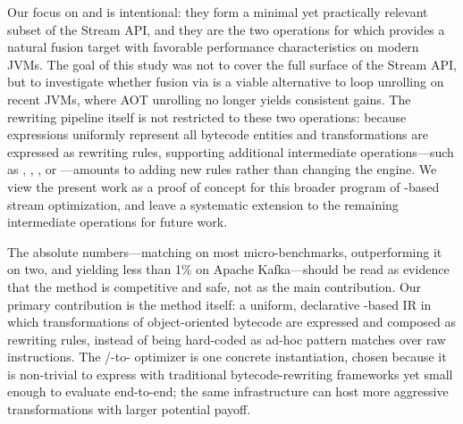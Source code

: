 Our focus on  and  is intentional: they form a minimal yet practically relevant subset of the Stream API, and they are the two operations for which  provides a natural fusion target with favorable performance characteristics on modern JVMs.
The goal of this study was not to cover the full surface of the Stream API, but to investigate whether fusion via  is a viable alternative to loop unrolling on recent JVMs, where AOT unrolling no longer yields consistent gains.
The rewriting pipeline itself is not restricted to these two operations: because \phic{} expressions uniformly represent all bytecode entities and transformations are expressed as rewriting rules, supporting additional intermediate operations---such as , , , or ---amounts to adding new rules rather than changing the engine.
We view the present work as a proof of concept for this broader program of \phic{}-based stream optimization, and leave a systematic extension to the remaining intermediate operations for future work.

The absolute numbers---matching \streamliner{} on most micro-benchmarks, outperforming it on two, and yielding less than 1\% on Apache Kafka---should be read as evidence that the method is competitive and safe, not as the main contribution.
Our primary contribution is the method itself: a uniform, declarative \phic{}-based IR in which transformations of object-oriented bytecode are expressed and composed as rewriting rules, instead of being hard-coded as ad-hoc pattern matches over raw instructions.
The /-to- optimizer is one concrete instantiation, chosen because it is non-trivial to express with traditional bytecode-rewriting frameworks yet small enough to evaluate end-to-end; the same infrastructure can host more aggressive transformations with larger potential payoff.
